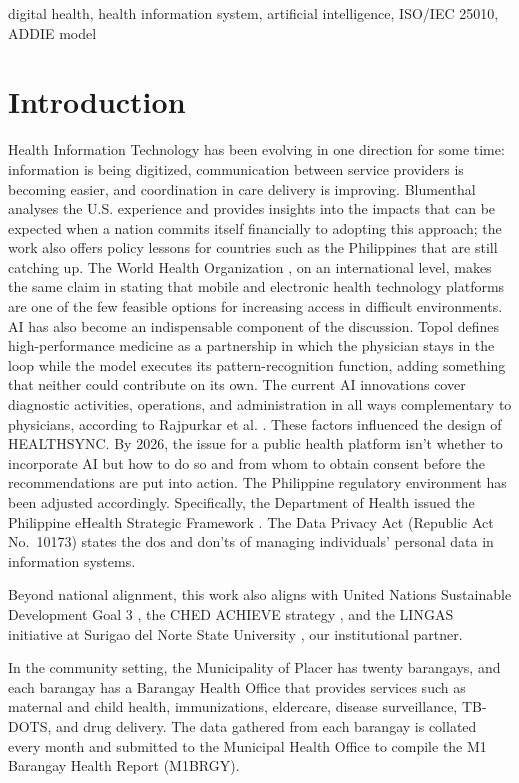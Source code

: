 \documentclass[conference]{IEEEtran}
\begin{document}
\begin{IEEEkeywords}
digital health, health information system, artificial intelligence, ISO/IEC 25010, ADDIE model
\end{IEEEkeywords}

\section{Introduction}
Health Information Technology has been evolving in one direction for some time: information is being digitized, communication between service providers is becoming easier, and coordination in care delivery is improving. Blumenthal \cite{b1} analyses the U.S. experience and provides insights into the impacts that can be expected when a nation commits itself financially to adopting this approach; the work also offers policy lessons for countries such as the Philippines that are still catching up. The World Health Organization \cite{b2}, on an international level, makes the same claim in stating that mobile and electronic health technology platforms are one of the few feasible options for increasing access in difficult environments. AI has also become an indispensable component of the discussion. Topol \cite{b3} defines high-performance medicine as a partnership in which the physician stays in the loop while the model executes its pattern-recognition function, adding something that neither could contribute on its own. The current AI innovations cover diagnostic activities, operations, and administration in all ways complementary to physicians, according to Rajpurkar et al. \cite{b4}. These factors influenced the design of HEALTHSYNC. By 2026, the issue for a public health platform isn't whether to incorporate AI but how to do so and from whom to obtain consent before the recommendations are put into action. The Philippine regulatory environment has been adjusted accordingly. Specifically, the Department of Health issued the Philippine eHealth Strategic Framework \cite{b5}. The Data Privacy Act \cite{b6} (Republic Act No.~10173) states the dos and don'ts of managing individuals' personal data in information systems.

Beyond national alignment, this work also aligns with United Nations Sustainable Development Goal 3 \cite{b7}, the CHED ACHIEVE strategy \cite{b8}, and the LINGAS initiative at Surigao del Norte State University \cite{b9}, our institutional partner.

In the community setting, the Municipality of Placer has twenty barangays, and each barangay has a Barangay Health Office that provides services such as maternal and child health, immunizations, eldercare, disease surveillance, TB-DOTS, and drug delivery. The data gathered from each barangay is collated every month and submitted to the Municipal Health Office to compile the M1 Barangay Health Report (M1BRGY).
\end{document}
